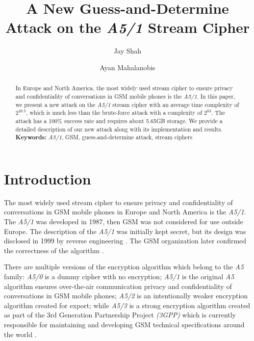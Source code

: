 \documentclass{llncs}
\begin{document}
\title{A New Guess-and-Determine Attack on the \emph {A5/1} Stream Cipher}
\author{Jay Shah \and Ayan Mahalanobis}
\maketitle
\begin{abstract}
In Europe and North America, the most widely used stream cipher to ensure privacy and confidentiality of conversations in GSM mobile phones is the \emph {A5/1}. In this paper, we present a new attack on the \emph {A5/1} stream cipher with an average time complexity of $2^{48.5}$, which is much less than the brute-force attack with a complexity of $2^{64}$. The attack has a 100\% success rate and requires about 5.65GB storage. We provide a detailed description of our new attack along with its implementation and results.
\newline
\textbf{Keywords:} \emph{A5/1}, GSM, guess-and-determine attack, stream ciphers
\end{abstract}

\section{Introduction}
The most widely used stream cipher to ensure privacy and confidentiality of conversations in GSM mobile phones in Europe and North America is the \emph {A5/1}. The \emph {A5/1} was developed in 1987, then GSM was not  considered for use outside Europe. The description of the \emph {A5/1} was initially kept secret, but its design was disclosed in 1999 by reverse engineering \cite{[Bri]}. The GSM organization later confirmed the correctness of the algorithm \cite{[Bir]}.

There are multiple versions of the encryption algorithm which belong to the \emph {A5} family: \emph {A5/0} is a dummy cipher with no encryption; \emph {A5/1} is the original \emph {A5} algorithm ensures over-the-air communication privacy and confidentiality of conversations in GSM mobile phones; \emph {A5/2} is an intentionally weaker encryption algorithm created for export; while \emph {A5/3} is a strong encryption algorithm created as part of the 3rd Generation Partnership Project \emph{(3GPP)} which is currently responsible for maintaining and developing GSM technical specifications around the world \cite{[Hill]}.
\end{document}
